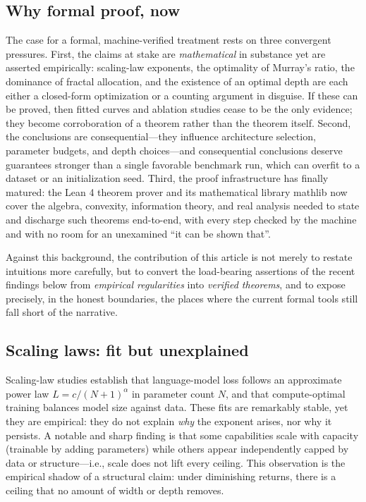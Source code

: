 \documentclass[journal]{IEEEtran}
\begin{document}
\subsection{Why formal proof, now}
\label{sec:why-formal}
The case for a formal, machine-verified treatment rests on three convergent
pressures. First, the claims at stake are \emph{mathematical} in substance yet
are asserted empirically: scaling-law exponents, the optimality of Murray's
ratio, the dominance of fractal allocation, and the existence of an optimal
depth are each either a closed-form optimization or a counting argument in
disguise. If these can be proved, then fitted curves and ablation studies
cease to be the only evidence; they become corroboration of a theorem rather
than the theorem itself. Second, the conclusions are consequential---they
influence architecture selection, parameter budgets, and depth choices---and
consequential conclusions deserve guarantees stronger than a single favorable
benchmark run, which can overfit to a dataset or an initialization seed. Third,
the proof infrastructure has finally matured: the Lean 4 theorem prover
\cite{lean4} and its mathematical library mathlib \cite{mathlib} now cover the
algebra, convexity, information theory, and real analysis needed to state and
discharge such theorems end-to-end, with every step checked by the machine and
with no room for an unexamined ``it can be shown that''.

Against this background, the contribution of this article is not merely to
restate intuitions more carefully, but to convert the load-bearing assertions
of the recent findings below from \emph{empirical regularities} into
\emph{verified theorems}, and to expose precisely, in the honest boundaries, the
places where the current formal tools still fall short of the narrative.

\subsection{Scaling laws: fit but unexplained}
\label{sec:scaling}
Scaling-law studies \cite{kaplan2020scaling,hoffmann2022train,brown2020language}
establish that language-model loss follows an approximate power law
$L=c/(N+1)^\alpha$ in parameter count $N$, and that compute-optimal training
balances model size against data. These fits are remarkably stable, yet they are
empirical: they do not explain \emph{why} the exponent arises, nor why it
persists. A notable and sharp finding is that some capabilities scale with
capacity (trainable by adding parameters) while others appear independently
capped by data or structure---i.e., scale does not lift every ceiling. This
observation is the empirical shadow of a structural claim: under diminishing
returns, there is a ceiling that no amount of width or depth removes.
\end{document}
